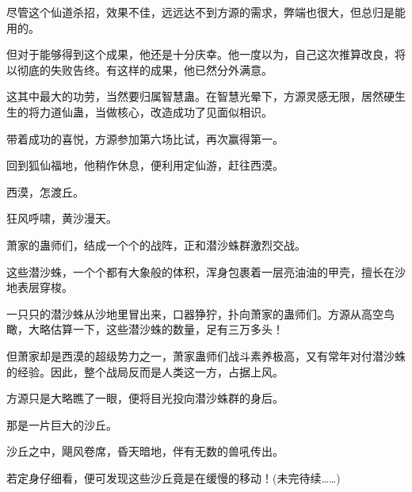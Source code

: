 \begin{this_body}
尽管这个仙道杀招，效果不佳，远远达不到方源的需求，弊端也很大，但总归是能用的。

但对于能够得到这个成果，他还是十分庆幸。他一度以为，自己这次推算改良，将以彻底的失败告终。有这样的成果，他已然分外满意。

这其中最大的功劳，当然要归属智慧蛊。在智慧光晕下，方源灵感无限，居然硬生生的将力道仙蛊，当做核心，改造成功了见面似相识。

带着成功的喜悦，方源参加第六场比试，再次赢得第一。

回到狐仙福地，他稍作休息，便利用定仙游，赶往西漠。

西漠，怎渡丘。

狂风呼啸，黄沙漫天。

萧家的蛊师们，结成一个个的战阵，正和潜沙蛛群激烈交战。

这些潜沙蛛，一个个都有大象般的体积，浑身包裹着一层亮油油的甲壳，擅长在沙地表层穿梭。

一只只的潜沙蛛从沙地里冒出来，口器狰狞，扑向萧家的蛊师们。方源从高空鸟瞰，大略估算一下，这些潜沙蛛的数量，足有三万多头！

但萧家却是西漠的超级势力之一，萧家蛊师们战斗素养极高，又有常年对付潜沙蛛的经验。因此，整个战局反而是人类这一方，占据上风。

方源只是大略瞧了一眼，便将目光投向潜沙蛛群的身后。

那是一片巨大的沙丘。

沙丘之中，飓风卷席，昏天暗地，伴有无数的兽吼传出。

若定身仔细看，便可发现这些沙丘竟是在缓慢的移动！(未完待续……)

\end{this_body}

